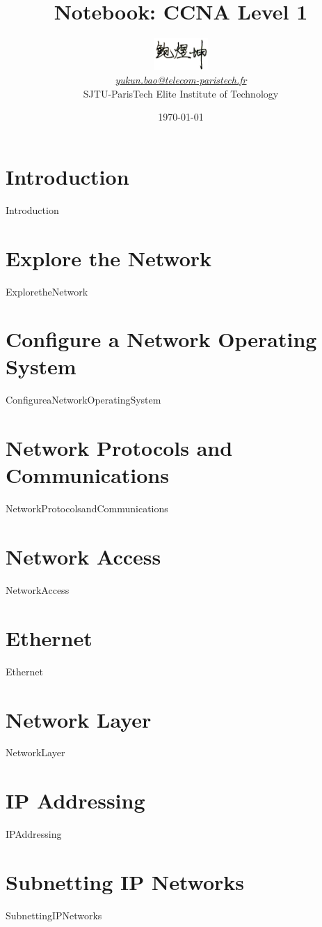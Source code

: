 \documentclass{article}
\title{Notebook: CCNA Level 1}
\author{\includegraphics[width=25mm, height=12mm]{signature}\\
        \href{mailto:yukun.bao@telecom-paristech.fr}{\textit{yukun.bao@telecom-paristech.fr}}\\
        SJTU-ParisTech Elite Institute of Technology}
\date{\today}
\begin{document}
\maketitle
\renewcommand*\contentsname{Course Index}
\tableofcontents
\thispagestyle{empty}
\newpage

\section*{Introduction}
{Introduction}

\section{Explore the Network}
{ExploretheNetwork}

\section{Configure a Network Operating System}
{ConfigureaNetworkOperatingSystem}

\section{Network Protocols and Communications}
{NetworkProtocolsandCommunications}

\section{Network Access}
{NetworkAccess}

\section{Ethernet}
{Ethernet}

\section{Network Layer}
{NetworkLayer}

\section{IP Addressing}
{IPAddressing}

\section{Subnetting IP Networks}
{SubnettingIPNetworks}
\end{document}
